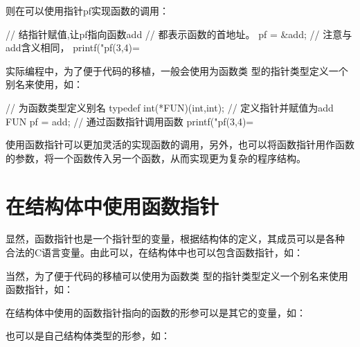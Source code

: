 \documentclass[scheme=chinese, heading = true, UTF8]{ctexart}
\begin{document}
则在可以使用指针pf实现函数的调用：

\begin{minipage}[h]{0.6\linewidth}
  \begin{cppcode}
    // 结指针赋值,让pf指向函数add    
    // 都表示函数的首地址。
    pf = &add; // 注意与add含义相同，
    printf("pf(3,4)=%
  \end{cppcode}
\end{minipage}

实际编程中，为了便于代码的移植，一般会使用为函数类
型的指针类型定义一个别名来使用，如：

\begin{minipage}[h]{0.6\linewidth}
  \begin{cppcode}
    // 为函数类型定义别名    
    typedef int(*FUN)(int,int);
    // 定义指针并赋值为add
    FUN pf = add;
    // 通过函数指针调用函数
    printf("pf(3,4)=%
  \end{cppcode}
\end{minipage}

使用函数指针可以更加灵活的实现函数的调用，另外，也可以将函数指针用作函数
的参数，将一个函数传入另一个函数，从而实现更为复杂的程序结构。
\section{在结构体中使用函数指针}\label{sec-structfuncpointer}
显然，函数指针也是一个指针型的变量，根据结构体的定义，其成员可以是各种
合法的C语言变量。由此可以，在结构体中也可以包含函数指针，如：

\begin{mdframed}
\end{mdframed}

当然，为了便于代码的移植可以使用为函数类
型的指针类型定义一个别名来使用函数指针，如：


\begin{mdframed}
\end{mdframed}

在结构体中使用的函数指针指向的函数的形参可以是其它的变量，如：

\begin{mdframed}
\end{mdframed}

也可以是自己结构体类型的形参，如：

\begin{mdframed}
\end{mdframed}
\end{document}
